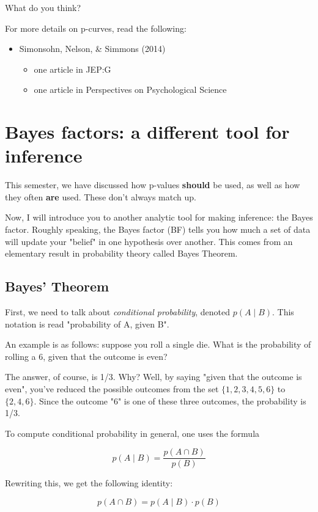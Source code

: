 \documentclass[11pt]{article}
\begin{document}
What do you think?

For more details on p-curves, read the following:
\begin{itemize}
\item Simonsohn, Nelson, \& Simmons (2014)
\begin{itemize}
\item one article in JEP:G
\item one article in Perspectives on Psychological Science
\end{itemize}
\end{itemize}


\section*{Bayes factors: a different tool for inference}
\label{sec-2}

This semester, we have discussed how p-values \textbf{should} be used, as well as how they often \textbf{are} used.  These don't always match up.

Now, I will introduce you to another analytic tool for making inference: the Bayes factor.  Roughly speaking, the Bayes factor (BF) tells you how much a set of data will update your "belief" in one hypothesis over another.  This comes from an elementary result in probability theory called Bayes Theorem.

\subsection*{Bayes' Theorem}
\label{sec-2-1}

First, we need to talk about \emph{conditional probability}, denoted $p(A \mid B)$.  This notation is read "probability of A, given B".

An example is as follows:  suppose you roll a single die.  What is the probability of rolling a 6, given that the outcome is even?

The answer, of course, is 1/3.  Why?  Well, by saying "given that the outcome is even", you've reduced the possible outcomes from the set $\{1,2,3,4,5,6\}$ to $\{2,4,6\}$.  Since the outcome "6" is one of these three outcomes, the probability is 1/3.

To compute conditional probability in general, one uses the formula 

\[
p(A\mid B) = \frac{p(A\cap B)}{p(B)}
\]

Rewriting this, we get the following identity:

\[
p(A\cap B) = p(A\mid B)\cdot p(B)
\]
\end{document}
